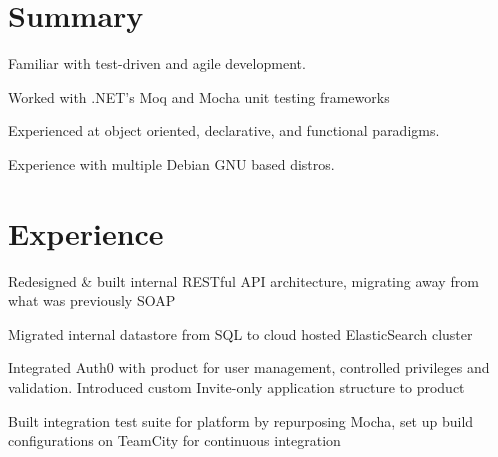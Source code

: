 \documentclass[letterpaper]{deedy-resume}
\begin{document}
\begin{minipage}[t]{0.66\textwidth} %

\section{Summary}
\vspace{\topsep} %
\begin{tightitemize}
\item Familiar with test-driven and agile development.
\item Worked with .NET's Moq and Mocha unit testing frameworks
\item Experienced at object oriented, declarative, and functional paradigms.
\item Experience with multiple Debian GNU based distros.

\end{tightitemize}


\section{Experience}


\begin{tightitemize}
\item Redesigned \& built internal RESTful API architecture, migrating away from what was previously SOAP
\item Migrated internal datastore from SQL to cloud hosted ElasticSearch cluster
\item Integrated Auth0 with product for user management, controlled privileges and validation. Introduced custom Invite-only application structure to product
\item Built integration test suite for platform by repurposing Mocha, set up build configurations on TeamCity for continuous integration

\end{tightitemize}

\sectionspace %



\end{minipage}
\end{document}
